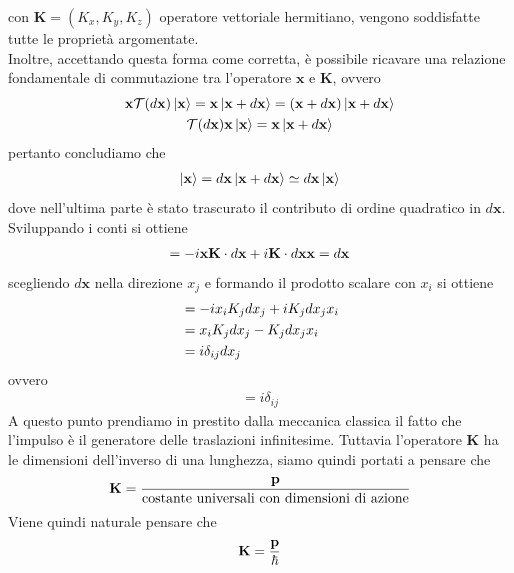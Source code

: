 \documentclass{article}
\begin{document}
con $\mathbf{K} = (K_x, K_y, K_z)$ operatore vettoriale hermitiano, vengono soddisfatte tutte le proprietà argomentate. \\
Inoltre, accettando questa forma come corretta, è possibile ricavare una relazione fondamentale di commutazione tra l'operatore $\mathbf{x}$ e $\mathbf{K}$, ovvero
\begin{gather}
    \mathbf{x}\mathcal{T}(d\mathbf{x}) \ket{\mathbf{x}} = \mathbf{x} \ket{\mathbf{x} + d\mathbf{x}} = (\mathbf{x} + d\mathbf{x}) \ket{\mathbf{x} + d\mathbf{x}} \notag \\
    \mathcal{T}(d\mathbf{x}) \mathbf{x} \ket{\mathbf{x}} = \mathbf{x} \ket{\mathbf{x} + d\mathbf{x}} \notag
\end{gather}
pertanto concludiamo che
\begin{gather}
    [\mathbf{x},\mathcal{T}(d\mathbf{x})]\ket{\mathbf{x}} = d\mathbf{x} \ket{\mathbf{x} + d\mathbf{x}} \simeq d\mathbf{x} \ket{\mathbf{x}} \notag
\end{gather}
dove nell'ultima parte è stato trascurato il contributo di ordine quadratico in $d\mathbf{x}$. \\
Sviluppando i conti si ottiene
\begin{gather}
    [\mathbf{x},\mathcal{T}(d\mathbf{x})] = -i\mathbf{x}\mathbf{K}\cdot d\mathbf{x} + i\mathbf{K} \cdot d\mathbf{x} \mathbf{x} = d\mathbf{x} \notag
\end{gather}
scegliendo $d\mathbf{x}$ nella direzione $x_j$ e formando il prodotto scalare con $x_i$ si ottiene
\begin{align}
    [\mathbf{x}, \mathcal{T}(d\mathbf{x})] &= -ix_iK_jdx_j + iK_jdx_jx_i \notag \\
    &= x_iK_jdx_j - K_jdx_jx_i \notag \\
    &= i\delta_{ij}dx_j \notag
\end{align}
ovvero
\begin{gather}
    [x_i, K_j] = i\delta_{ij} \tag{2.1.1}
\end{gather}
A questo punto prendiamo in prestito dalla meccanica classica il fatto che l'impulso è il generatore delle traslazioni infinitesime. Tuttavia l'operatore $\mathbf{K}$ ha le dimensioni dell'inverso di una lunghezza, siamo quindi portati a pensare che
\begin{gather}
    \mathbf{K} = \frac{\mathbf{p}}{\text{costante universali con dimensioni di azione}} \notag
\end{gather}
Viene quindi naturale pensare che
\begin{gather}
    \mathbf{K} = \frac{\mathbf{p}}{\hbar} \notag
\end{gather}
\end{document}

